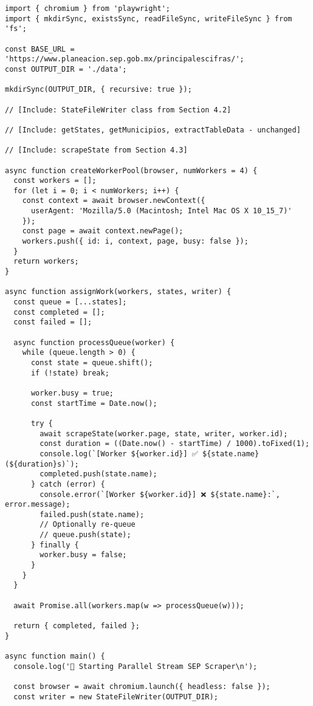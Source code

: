 \documentclass[11pt,a4paper]{article}
\begin{document}
\begin{lstlisting}[caption={Full Parallel + Stream Implementation}]
import { chromium } from 'playwright';
import { mkdirSync, existsSync, readFileSync, writeFileSync } from 'fs';

const BASE_URL = 'https://www.planeacion.sep.gob.mx/principalescifras/';
const OUTPUT_DIR = './data';

mkdirSync(OUTPUT_DIR, { recursive: true });

// [Include: StateFileWriter class from Section 4.2]

// [Include: getStates, getMunicipios, extractTableData - unchanged]

// [Include: scrapeState from Section 4.3]

async function createWorkerPool(browser, numWorkers = 4) {
  const workers = [];
  for (let i = 0; i < numWorkers; i++) {
    const context = await browser.newContext({
      userAgent: 'Mozilla/5.0 (Macintosh; Intel Mac OS X 10_15_7)'
    });
    const page = await context.newPage();
    workers.push({ id: i, context, page, busy: false });
  }
  return workers;
}

async function assignWork(workers, states, writer) {
  const queue = [...states];
  const completed = [];
  const failed = [];

  async function processQueue(worker) {
    while (queue.length > 0) {
      const state = queue.shift();
      if (!state) break;

      worker.busy = true;
      const startTime = Date.now();

      try {
        await scrapeState(worker.page, state, writer, worker.id);
        const duration = ((Date.now() - startTime) / 1000).toFixed(1);
        console.log(`[Worker ${worker.id}] ✅ ${state.name} (${duration}s)`);
        completed.push(state.name);
      } catch (error) {
        console.error(`[Worker ${worker.id}] ❌ ${state.name}:`, error.message);
        failed.push(state.name);
        // Optionally re-queue
        // queue.push(state);
      } finally {
        worker.busy = false;
      }
    }
  }

  await Promise.all(workers.map(w => processQueue(w)));

  return { completed, failed };
}

async function main() {
  console.log('🚀 Starting Parallel Stream SEP Scraper\n');

  const browser = await chromium.launch({ headless: false });
  const writer = new StateFileWriter(OUTPUT_DIR);


\end{lstlisting}
\end{document}

